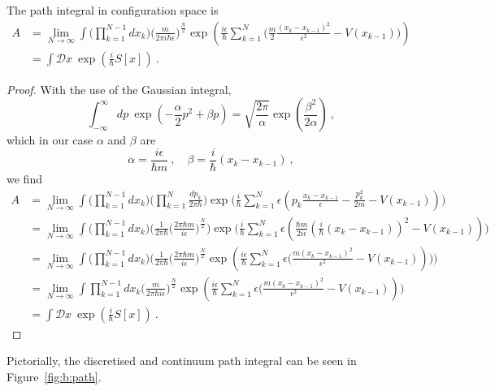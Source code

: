     The path integral in configuration space is 
    \begin{equation}\label{b:pathconfig}
    \begin{aligned}
        A & = \lim_{N \rightarrow \infty} \int \Big (\prod_{k=1}^{N-1} d x_k \Big ) \Big (\frac{m}{2 \pi i \hbar \epsilon} \Big )^{\frac{N}{2}} \exp(\frac{i \epsilon}{\hbar} \sum_{k=1}^{N} \Big (\frac{m}{2} \frac{(x_k - x_{k-1})^2}{\epsilon^2} - V(x_{k-1})\Big )) \\ & = \int \mathcal D x ~ \exp(\frac{i}{\hbar} S[x]) ~.
    \end{aligned}
    \end{equation}
    \begin{proof}
        With the use of the Gaussian integral, 
        \begin{equation*}
            \int_{- \infty}^\infty dp ~ \exp(- \frac{\alpha}{2} p^2 + \beta p) = \sqrt{\frac{2\pi}{\alpha}} \exp(\frac{\beta^2}{2\alpha}) ~,
        \end{equation*}
        which in our case $\alpha$ and $\beta$ are 
        \begin{equation*}
            \alpha = \frac{i\epsilon}{\hbar m} ~, \quad \beta = \frac{i}{\hbar} (x_k - x_{k-1}) ~,
        \end{equation*}
        we find 
        \begin{equation*}
        \begin{aligned}
            A & = \lim_{N \rightarrow \infty} \int \Big ( \prod_{k=1}^{N-1} dx_k \Big) \Big ( \prod_{k=1}^{N} \frac{dp_k}{2 \pi \hbar} \Big) \exp \Big ( \frac{i}{\hbar} \sum_{k=1}^N \epsilon (p_k \frac{x_k - x_{k-1}}{\epsilon} - \frac{p_k^2}{2m} - V(x_{k-1}) ) \Big ) \\ & = \lim_{N \rightarrow \infty} \int \Big (\prod_{k=1}^{N-1} d x_k \Big ) \Big (\frac{1}{2\pi\hbar} \Big (\frac{2\pi \hbar m}{i \epsilon} \Big)^{\frac{N}{2}} \Big ) \exp \Big ( \frac{i}{\hbar} \sum_{k=1}^N \epsilon (\frac{\hbar m}{2 i \epsilon} (\frac{i}{\hbar} (x_k - x_{k-1}))^2 - V(x_{k-1}) ) \Big ) \\ & = \lim_{N \rightarrow \infty} \int \Big (\prod_{k=1}^{N-1} d x_k \Big ) \Big (\frac{1}{2\pi\hbar} \Big (\frac{2\pi \hbar m}{i \epsilon} \Big)^{\frac{N}{2}}  \exp(\frac{i \epsilon}{\hbar} \sum_{k=1}^{N} \epsilon \Big (\frac{m (x_k - x_{k-1})^2}{\epsilon^2} - V(x_{k-1})) \Big ) \Big ) \\ & = \lim_{N \rightarrow \infty} \int \prod_{k=1}^{N-1} d x_k \Big (\frac{m}{2 \pi \hbar i \epsilon} \Big)^{\frac{N}{2}}  \exp(\frac{i \epsilon}{\hbar} \sum_{k=1}^{N} \epsilon \Big (\frac{m (x_k - x_{k-1})^2}{\epsilon^2} - V(x_{k-1})) \Big ) \\ & = \int \mathcal D x ~ \exp(\frac{i}{\hbar} S[x]) ~.
        \end{aligned}
        \end{equation*}
    \end{proof}
    Pictorially, the discretised and continuum path integral can be seen in Figure~\eqref{fig:b:path}.

